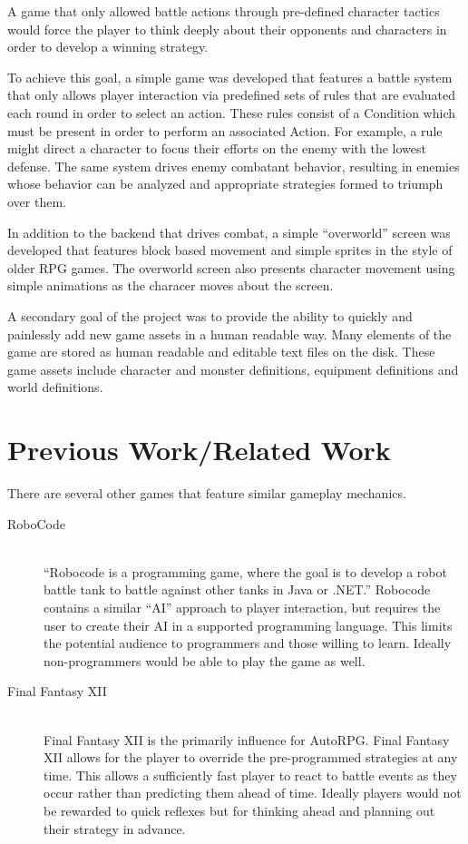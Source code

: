 \documentclass[11pt]{article}
\begin{document}
A game that only allowed battle actions through pre-defined character tactics would force the player to think deeply about their opponents and characters in order to develop a winning strategy. 

To achieve this goal, a simple game was developed that features a battle system that only allows player interaction via predefined sets of rules that are evaluated each round in order to select an action.  These rules consist of a Condition which must be present in order to perform an associated Action.  For example, a rule might direct a character to focus their efforts on the enemy with the lowest defense. The same system drives enemy combatant behavior, resulting in enemies whose behavior can be analyzed and appropriate strategies formed to triumph over them.

In addition to the backend that drives combat, a simple ``overworld'' screen was developed that features block based movement and simple sprites in the style of older RPG games.  The overworld screen also presents character movement using simple animations as the characer moves about the screen.  

A secondary goal of the project was to provide the ability to quickly and painlessly add new game assets in a human readable way.  Many elements of the game are stored as human readable and editable text files on the disk.  These game assets include character and monster definitions, equipment definitions and world definitions.

\section{Previous Work/Related Work}

There are several other games that feature similar gameplay mechanics.  

\begin{description}
\item[RoboCode \cite{RoboCode}] \hfill \\
      ``Robocode is a programming game, where the goal is to develop a robot battle tank to battle against other tanks in Java or .NET.'' Robocode contains a similar ``AI'' approach to player interaction, but requires the user to create their AI in a supported programming language.  This limits the potential audience to programmers and those willing to learn.  Ideally non-programmers would be able to play the game as well.

\item[Final Fantasy XII \cite{Gambits}] \hfill \\
      Final Fantasy XII is the primarily influence for AutoRPG. Final Fantasy XII allows for the player to override the pre-programmed strategies at any time.  This allows a sufficiently fast player to react to battle events as they occur rather than predicting them ahead of time.  Ideally players would not be rewarded to quick reflexes but for thinking ahead and planning out their strategy in advance.

\end{description}
\end{document}
